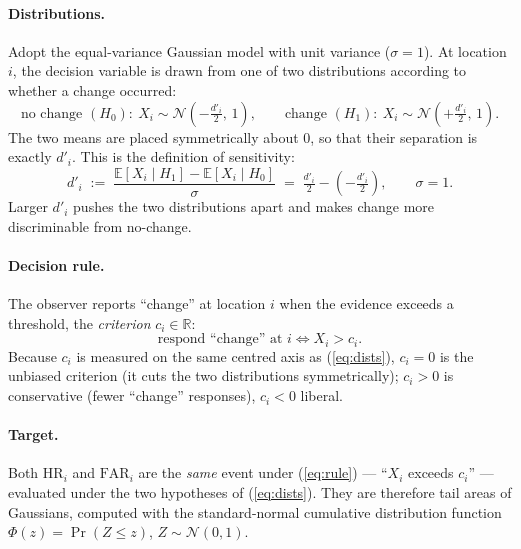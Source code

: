 \documentclass[11pt]{article}
\theoremstyle{remark}
\newcommand{\HR}{\mathrm{HR}}
\newcommand{\FAR}{\mathrm{FAR}}
\newcommand{\dprime}{d'}
\begin{document}
\paragraph{Distributions.}
Adopt the equal-variance Gaussian model with unit variance
($\sigma = 1$). At location $i$, the decision variable is drawn from
one of two distributions according to whether a change occurred:
\begin{equation}
  \text{no change } (H_0):\ X_i \sim \mathcal{N}\!\left(-\tfrac{\dprime_i}{2},\, 1\right),
  \qquad
  \text{change } (H_1):\ X_i \sim \mathcal{N}\!\left(+\tfrac{\dprime_i}{2},\, 1\right).
  \label{eq:dists}
\end{equation}
The two means are placed symmetrically about $0$, so that their
separation is exactly $\dprime_i$. This is the definition of
sensitivity:
\begin{equation}
  \dprime_i
  \;:=\;
  \frac{\mathbb{E}[X_i \mid H_1] - \mathbb{E}[X_i \mid H_0]}{\sigma}
  \;=\; \tfrac{\dprime_i}{2} - \left(-\tfrac{\dprime_i}{2}\right),
  \qquad \sigma = 1 .
  \label{eq:dprime-def}
\end{equation}
Larger $\dprime_i$ pushes the two distributions apart and makes change
more discriminable from no-change.

\paragraph{Decision rule.}
The observer reports ``change'' at location $i$ when the evidence
exceeds a threshold, the \emph{criterion} $c_i \in \mathbb{R}$:
\begin{equation}
  \text{respond ``change'' at } i
  \iff
  X_i > c_i .
  \label{eq:rule}
\end{equation}
Because $c_i$ is measured on the same centred axis as
(\ref{eq:dists}), $c_i = 0$ is the unbiased criterion (it cuts the two
distributions symmetrically); $c_i > 0$ is conservative (fewer
``change'' responses), $c_i < 0$ liberal.

\paragraph{Target.}
Both $\HR_i$ and $\FAR_i$ are the \emph{same} event under
(\ref{eq:rule}) --- ``$X_i$ exceeds $c_i$'' --- evaluated under the two
hypotheses of (\ref{eq:dists}). They are therefore tail areas of
Gaussians, computed with the standard-normal cumulative distribution
function $\Phi(z) = \Pr(Z \le z)$, $Z \sim \mathcal{N}(0,1)$.
\end{document}
